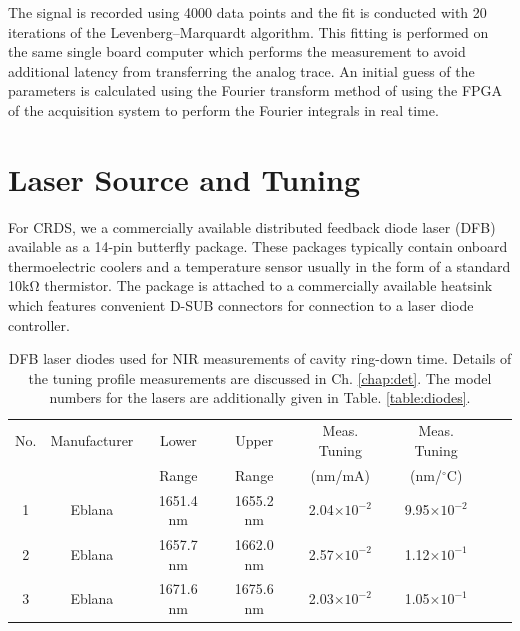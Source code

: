 \documentclass[12pt]{report}
\begin{document}
	The signal is recorded using 4000 data points and the fit is conducted with 20 iterations
	of the Levenberg–Marquardt algorithm. This fitting is performed on the same single board
	computer which performs the measurement to avoid additional latency from transferring
	the analog trace. An initial guess of the parameters is calculated using the Fourier transform
	method of \cite{fourier_transform_exponentialDecay} using the FPGA of the acquisition system to perform the Fourier integrals
	in real time.
	
	\section{Laser Source and Tuning}
	For CRDS, we a commercially available distributed feedback diode laser (DFB) available as a 14-pin butterfly package. These packages typically contain onboard thermoelectric coolers and a temperature sensor usually in the form of a standard 10k$\mathrm{\Omega}$ thermistor. The package is attached to a commercially available heatsink which features convenient D-SUB connectors for connection to a laser diode controller.
	
	\begin{table}[H]
		\begin{center}
			\caption{DFB laser diodes used for NIR measurements of cavity ring-down time. Details of the tuning profile measurements are discussed in Ch. \ref{chap:det}. The model numbers for the lasers are additionally given in Table. \ref{table:diodes}.} \label{table:crds_diodes}
			\begin{tabular}{|c|c|c|c|c|c|c|c|}
				\hline
				No. & Manufacturer & Lower & Upper  & Meas. Tuning & Meas. Tuning \\
				& & Range & Range & (nm/mA) & (nm/$^\circ$C) \\
				\hline
				1 & Eblana & 1651.4 nm & 1655.2 nm & 2.04$\times10^{-2}$ & 9.95$\times10^{-2}$ \\
				\hline
				2 & Eblana & 1657.7 nm & 1662.0 nm & 2.57$\times10^{-2}$ & 1.12$\times10^{-1}$ \\
				\hline
				3 & Eblana & 1671.6 nm & 1675.6 nm & 2.03$\times10^{-2}$ & 1.05$\times10^{-1}$ \\
				\hline
			\end{tabular}
		\end{center}
	\end{table}
	
\end{document}
